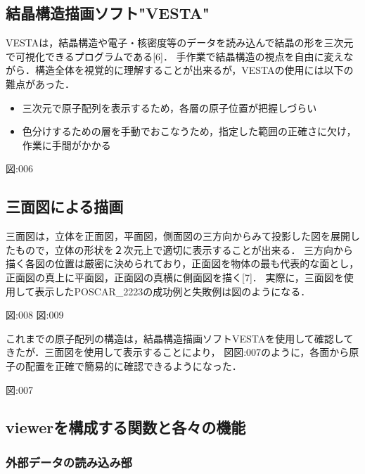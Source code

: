 
\subsection{結晶構造描画ソフト"VESTA"}
VESTAは，結晶構造や電子・核密度等のデータを読み込んで結晶の形を三次元で可視化できるプログラムである[6]．
手作業で結晶構造の視点を自由に変えながら．構造全体を視覚的に理解することが出来るが，VESTAの使用には以下の難点があった．

\begin{itemize}
\item 三次元で原子配列を表示するため，各層の原子位置が把握しづらい
\item 色分けするための層を手動でおこなうため，指定した範囲の正確さに欠け，作業に手間がかかる
\end{itemize}
{図:006}

\subsection{三面図による描画}
三面図は，立体を正面図，平面図，側面図の三方向からみて投影した図を展開したもので，立体の形状を２次元上で適切に表示することが出来る．
三方向から描く各図の位置は厳密に決められており，正面図を物体の最も代表的な面とし，正面図の真上に平面図，正面図の真横に側面図を描く[7]．
実際に，三面図を使用して表示したPOSCAR\_2223の成功例と失敗例は図のようになる．

{図:008} {図:009}

これまでの原子配列の構造は，結晶構造描画ソフトVESTAを使用して確認してきたが．三面図を使用して表示することにより，
図{図:007}のように，各面から原子の配置を正確で簡易的に確認できるようになった．

{図:007}

\subsection{viewerを構成する関数と各々の機能}
\subsubsection{外部データの読み込み部}
